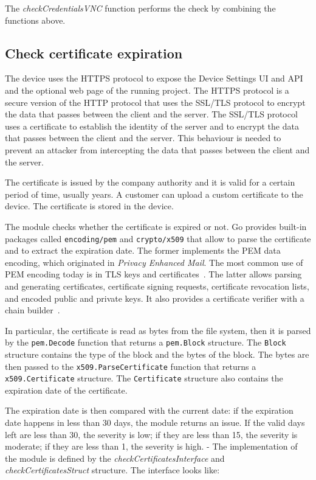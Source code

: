 The \textit{checkCredentialsVNC} function performs the check by combining the functions above.

\subsection{Check certificate expiration}

The device uses the HTTPS protocol to expose the Device Settings UI and API and the optional web page of the running project. The HTTPS protocol is a secure version of the HTTP protocol that uses the SSL/TLS protocol to encrypt the data that passes between the client and the server. The SSL/TLS protocol uses a certificate to establish the identity of the server and to encrypt the data that passes between the client and the server. This behaviour is needed to prevent an attacker from intercepting the data that passes between the client and the server.

The certificate is issued by the company authority and it is valid for a certain period of time, usually years. A customer can upload a custom certificate to the device. The certificate is stored in the device.

The module checks whether the certificate is expired or not. Go provides built-in packages called \texttt{encoding/pem} and \texttt{crypto/x509} that allow to parse the certificate and to extract the expiration date. The former implements the PEM data encoding, which originated in \textit{Privacy Enhanced Mail}. The most common use of PEM encoding today is in TLS keys and certificates~\cite{go-package-pem}. The latter allows parsing and generating certificates, certificate signing requests, certificate revocation lists, and encoded public and private keys. It also provides a certificate verifier with a chain builder~\cite{go-package-x509}.

In particular, the certificate is read as bytes from the file system, then it is parsed by the \texttt{pem.Decode} function that returns a \texttt{pem.Block} structure. The \texttt{Block} structure contains the type of the block and the bytes of the block. The bytes are then passed to the \texttt{x509.ParseCertificate} function that returns a \texttt{x509.Certificate} structure. The \texttt{Certificate} structure also contains the expiration date of the certificate.

The expiration date is then compared with the current date: if the expiration date happens in less than 30 days, the module returns an issue. If the valid days left are less than 30, the severity is low; if they are less than 15, the severity is moderate; if they are less than 1, the severity is high.
-
The implementation of the module is defined by the \textit{checkCertificatesInterface} and \textit{checkCertificatesStruct} structure. The interface looks like:

